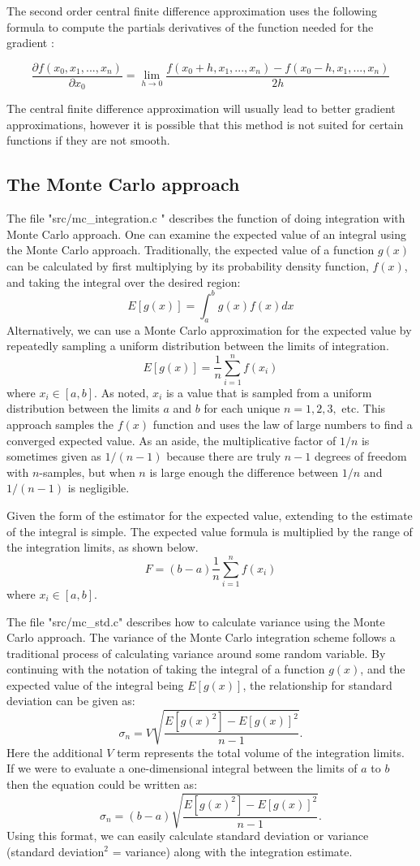 \documentclass{book}
\begin{document}
The second order central finite difference approximation uses the following formula to compute the partials derivatives of the function needed for the gradient :

$$
\frac{\partial{f(x_0, x_1, ..., x_n)}}{\partial{x_0}} = \lim_{h\to 0} \frac{f(x_0 + h, x_1, ..., x_n) - f(x_0 - h, x_1, ..., x_n)}{2h}
$$

The central finite difference approximation will usually lead to better gradient approximations, however it is possible that this method is not suited for certain functions if they are not smooth.
\subsection{The Monte Carlo approach}

The file "src/mc\_integration.c " describes the function of doing integration with Monte Carlo approach.
One can examine the expected value of an integral using the Monte Carlo approach. Traditionally, the
expected value of a function $g(x)$ can be calculated by first multiplying by its probability density function,
$f(x)$, and taking the integral over the desired region:
$$
 E [ g(x) ] = \int_a^b g(x) f(x) dx
$$
Alternatively, we can use a Monte Carlo approximation for the expected value by repeatedly
sampling a uniform distribution between the limits of integration.
$$
 E [ g(x) ] = \frac{1}{n} \sum_{i=1}^n f(x_i)
$$
where $x_i \in [a, b]$. As noted, $x_i$  is a value that is sampled from a uniform distribution
between the limits $a$ and $b$ for each unique $n = 1,2,3,$ etc. This approach samples the $f(x)$
function and uses the law of large numbers to find a converged expected value.
As an aside, the multiplicative factor of $1/n$ is sometimes given as $1/(n-1)$ because there are
truly $n-1$ degrees of freedom with $n$-samples, but when $n$ is large enough the difference between
$1/n$ and $1/(n-1)$ is negligible.

Given the form of the estimator for the expected value, extending to the estimate of the integral is simple.
The expected value formula is multiplied by the range of the integration limits, as shown below.
$$
 F = (b-a) \frac{1}{n} \sum_{i=1}^n f(x_i)
$$
where $x_i \in [a, b]$.

The file "src/mc\_std.c" describes how to calculate variance using the Monte Carlo approach. The variance of
the Monte Carlo integration scheme follows a traditional process of calculating variance around some random variable.
By continuing with the notation of taking the integral of a function $g(x)$, and the expected value of the integral being $E[g(x)]$,
the relationship for standard deviation can be given as:
$$
 \sigma_n = V \sqrt{\frac{E[g(x)^2] - E[g(x)]^2}{n-1}}.
$$
Here the additional $V$ term represents the total volume of the integration limits. If we were to evaluate a one-dimensional
integral between the limits of $a$ to $b$ then the equation could be written as:
$$
 \sigma_n = (b-a) \sqrt{\frac{E[g(x)^2] - E[g(x)]^2}{n-1}}.
$$
Using this format, we can easily calculate standard deviation or variance (standard deviation$^2$ = variance) along with the integration estimate.
\end{document}
